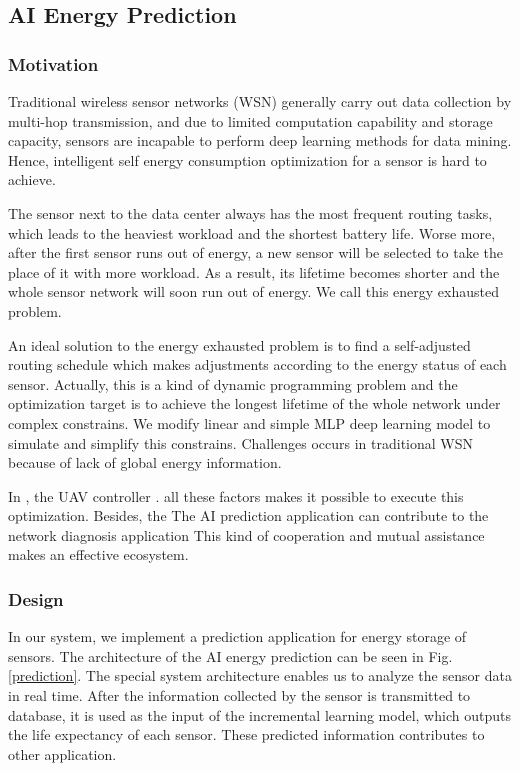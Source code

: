 \subsection{AI Energy Prediction}

\subsubsection{Motivation}
Traditional wireless sensor networks (WSN)  generally carry out data 
collection by multi-hop transmission,
and due to limited computation capability and storage capacity, sensors are incapable
to perform deep learning methods for data mining. 
Hence, intelligent self energy consumption optimization for a sensor is hard to achieve.

The sensor next to the data center always has the most frequent routing tasks, which leads to
the heaviest workload and the shortest battery life. Worse more, after the
first sensor runs out of energy, a new sensor will be selected to take the place 
of it with more workload. As a result, its lifetime becomes shorter and the whole 
sensor network will soon run out of energy. We call this energy exhausted problem.

An ideal solution to the energy exhausted problem is to find a self-adjusted routing schedule which 
makes adjustments according to the energy status of each sensor. 
Actually, this is a kind of dynamic programming problem and
the optimization target is to achieve the longest lifetime of the whole network under
complex constrains. We modify linear and simple MLP\cite{} deep learning model to simulate and simplify
this constrains. Challenges occurs in traditional WSN because of lack
of global energy information. 

In {\sdn}, the UAV controller .   
all these factors makes it possible to execute
this optimization. Besides, the 
The AI prediction application can contribute to the network diagnosis application
This kind of cooperation and mutual assistance makes {\sdn} an effective ecosystem.

\subsubsection{Design}
In our {\sdn} system, we implement a prediction application for 
energy storage of sensors. The architecture of the AI energy prediction
can be seen in Fig. \ref{prediction}. The special system architecture enables
us to analyze the sensor data in real time. After the information 
collected by the sensor is transmitted to database, it is used as
the input of the incremental learning model, which outputs the
life expectancy of each sensor. These predicted information contributes
to other application. 


